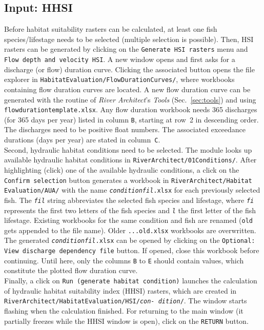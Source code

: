 \subsection{Input: HHSI} \label{sec:hemakehsi}
Before habitat suitability rasters can be calculated, at least one fish species/lifestage needs to be selected (multiple selection is possible). Then, HSI rasters can be generated by clicking on the \texttt{Generate HSI rasters} menu and \texttt{Flow depth and velocity HSI}. A new window opens and first asks for a discharge (or flow) duration curve. Clicking the associated button opens the file explorer in \texttt{HabitatEvaluation/FlowDurationCurves/}, where workbooks containing flow duration curves are located. A new flow duration curve can be generated with the  routine of \textit{River Architect}'s \textit{Tools} (Sec.~\ref{sec:tools}) and using \texttt{flow{\myUnderscore}duration{\myUnderscore}template.xlsx}. Any flow duration workbook needs 365 discharges (for 365 days per year) listed in column \texttt{B}, starting at row~2 in descending order. The discharges need to be positive float numbers. The associated exceedance durations (days per year) are stated in column~\texttt{C}.\\
Second, hydraulic habitat conditions need to be selected. The module looks up available hydraulic habitat conditions in \texttt{RiverArchitect/01{\myUnderscore}Conditions/}. After highlighting (click) one of the available hydraulic conditions, a click on the \texttt{Confirm selection} button generates a workbook in \texttt{RiverArchitect/Habitat Evaluation/AUA/} with the name \texttt{\textit{condition}{\myUnderscore}\textit{fil}.xlsx} for each previously selected fish. The \texttt{\textit{fil}} string abbreviates the selected fish species and lifestage, where \texttt{\textit{fi}} represents the first two letters of the fish species and \texttt{\textit{l}} the first letter of the fish lifestage. Existing workbooks for the same condition and fish are renamed (\texttt{{\myUnderscore}old} gets appended to the file name). Older \texttt{...{\myUnderscore}old.xlsx} workbooks are overwritten.\\
The generated \texttt{\textit{condition}{\myUnderscore}\textit{fil}.xlsx} can be opened by clicking on the \texttt{Optional: View discharge dependency file} button. If opened, close this workbook before continuing. Until here, only the columns \texttt{B} to \texttt{E} should contain values, which constitute the plotted flow duration curve.\\
Finally, a click on \texttt{Run (generate habitat condition)} launches the calculation of hydraulic habitat suitability index (HHSI) rasters, which are created in \texttt{RiverArchitect/HabitatEvaluation/HSI/\textit{con- dition}/}. The window starts flashing when the calculation finished. For returning to the main window (it partially freezes while the HHSI window is open), click on the \texttt{RETURN} button.

